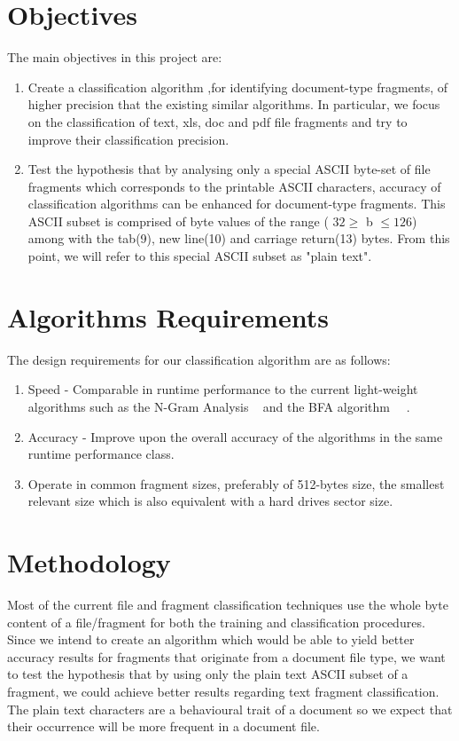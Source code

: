 
\section{Objectives}
The main objectives in this project are:
\begin{enumerate}
\item Create a classification algorithm ,for identifying document-type fragments, of higher precision that the existing similar algorithms. In particular, we focus on the classification of text, xls, doc and pdf file fragments and try to improve their classification precision.
\item Test the hypothesis that by analysing only a special ASCII byte-set of file fragments which corresponds to the printable ASCII characters, accuracy of classification algorithms can be enhanced for document-type fragments. This ASCII subset is comprised of byte values of the range ( $32\geq$ b $\leq 126$) among with the tab(9), new line(10) and carriage return(13) bytes. From this point, we will refer to this special ASCII subset as "plain text".




\end{enumerate}

\section{Algorithms Requirements}
The design requirements for our classification algorithm are as follows:
\begin{enumerate}
\item Speed - Comparable in runtime performance to the current light-weight algorithms such as the N-Gram Analysis \cite{ngram}~\cite{Ashim} and the BFA algorithm ~\cite{MacDaniel}~\cite{Ashim}.
\item Accuracy - Improve upon the overall accuracy of the algorithms in the same runtime performance class.
\item Operate in common fragment sizes, preferably of 512-bytes size, the smallest relevant size which is also equivalent with a hard drives sector size.
\end{enumerate}

\section{Methodology}
Most of the current file and fragment classification techniques use the whole byte content of a file/fragment for both the training and classification procedures. Since we intend to create an algorithm which would be able to yield better accuracy results for fragments that originate from a document file type, we want to test the hypothesis that by using only the plain text ASCII subset of a fragment, we could achieve better results regarding text fragment classification. The plain text characters are a behavioural trait of a document so we expect that their occurrence will be more frequent in a document file.

